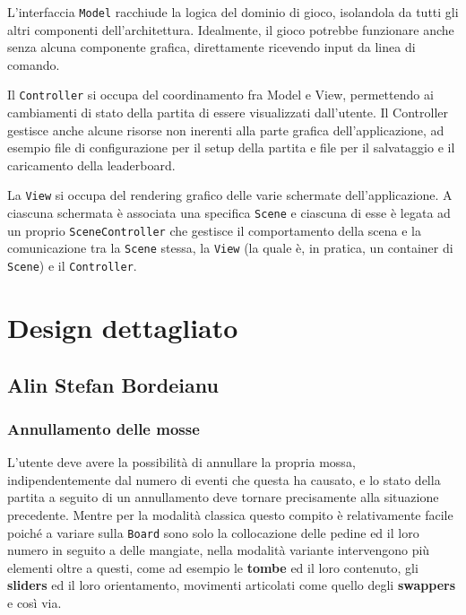 \documentclass[a4paper,12pt]{report}
\begin{document}
L'interfaccia \texttt{Model} racchiude la logica del dominio di gioco, isolandola da tutti gli altri componenti dell'architettura. Idealmente, il gioco potrebbe funzionare anche senza alcuna componente grafica, direttamente ricevendo input da linea di comando.

Il \texttt{Controller} si occupa del coordinamento fra Model e View, permettendo ai cambiamenti di stato della partita di essere visualizzati dall'utente. Il Controller gestisce anche alcune risorse non inerenti alla parte grafica dell'applicazione, ad esempio file di configurazione per il setup della partita e file per il salvataggio e il caricamento della leaderboard.

La \texttt{View} si occupa del rendering grafico delle varie schermate dell'applicazione. A ciascuna schermata è associata una specifica \texttt{Scene} e ciascuna di esse è legata ad un proprio \texttt{SceneController} che gestisce il comportamento della scena e la comunicazione tra la \texttt{Scene} stessa, la \texttt{View} (la quale è, in pratica, un container di \texttt{Scene}) e il \texttt{Controller}.

\section{Design dettagliato}

\subsection{Alin Stefan Bordeianu}

\subsubsection{Annullamento delle mosse}

L'utente deve avere la possibilità di annullare la propria mossa, indipendentemente dal numero di eventi che questa ha causato, e lo stato della partita a seguito di un annullamento deve tornare precisamente alla situazione precedente. Mentre per la modalità classica questo compito è relativamente facile poiché a variare sulla \texttt{Board} sono solo la collocazione delle pedine ed il loro numero in seguito a delle mangiate, nella modalità variante intervengono più elementi oltre a questi, come ad esempio le \textbf{tombe} ed il loro contenuto, gli \textbf{sliders} ed il loro orientamento, movimenti articolati come quello degli \textbf{swappers} e così via.
\end{document}
